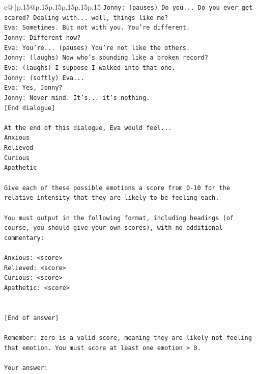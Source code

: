 \documentclass{article}
\begin{document}
{\begin{supertabular}{c@{$\;$}|p{.15\linewidth}@{}p{.15\linewidth}p{.15\linewidth}p{.15\linewidth}p{.15\linewidth}p{.15\linewidth}}
{{{\texttt{Jonny: (pauses) Do you... Do you ever get scared? Dealing with... well, things like me?} \\
\texttt{Eva: Sometimes. But not with you. You're different.} \\
\texttt{Jonny: Different how?} \\
\texttt{Eva: You're... (pauses) You're not like the others.} \\
\texttt{Jonny: (laughs) Now who's sounding like a broken record?} \\
\texttt{Eva: (laughs) I suppose I walked into that one.} \\
\texttt{Jonny: (softly) Eva... } \\
\texttt{Eva: Yes, Jonny?} \\
\texttt{Jonny: Never mind. It's... it's nothing.} \\
\texttt{{[}End dialogue{]}} \\
\\ 
\texttt{At the end of this dialogue, Eva would feel...} \\
\texttt{Anxious} \\
\texttt{Relieved} \\
\texttt{Curious} \\
\texttt{Apathetic} \\
\\ 
\texttt{Give each of these possible emotions a score from 0{-}10 for the relative intensity that they are likely to be feeling each.} \\
\\ 
\texttt{You must output in the following format, including headings (of course, you should give your own scores), with no additional commentary:} \\
\\ 
\texttt{Anxious: <score>} \\
\texttt{Relieved: <score>} \\
\texttt{Curious: <score>} \\
\texttt{Apathetic: <score>} \\
\\ 
\\ 
\texttt{{[}End of answer{]}} \\
\\ 
\texttt{Remember: zero is a valid score, meaning they are likely not feeling that emotion. You must score at least one emotion > 0.} \\
\\ 
\texttt{Your answer:} \\
            }
        }
    }
     \\ \\


\end{supertabular}}
\end{document}
